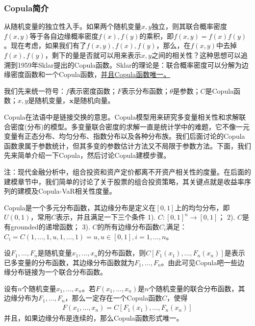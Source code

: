         \subsubsection{Copula简介}
            \par
            从随机变量的独立性入手。如果两个随机变量$x,y$独立，则其联合概率密度$f(x,y)$等于各自边缘概率密度$f(x),f(y)$的乘积，即$f(x,y) = f(x)f(y)$。现在考虑，如果我们有了$f(x,y),f(x),f(y)$，那么，在$f(x,y)$中去掉$f(x),f(y)$，剩下的量是否就可以用来表示$x,y$之间的相关性？这种思想可以追溯到1959年Sklar提出的Copula函数。Sklar的理论是：联合概率密度可以分解为边缘密度函数和一个Copula函数，\underline{并且Copula函数唯一。}
            \par
            我们先来统一符号：$f$表示密度函数；$F$表示分布函数；$\theta$是参数；$C$是Copula函数；$x,y$是随机变量，$\mathbf{x}$是随机向量。
            \par
            Copula在法语中是链接交换的意思。Copula模型用来研究多变量相关性和求解联合密度(分布)的模型。多变量联合密度的求解一直是统计学中的难题，它不像一元变量有正态分布、均匀分布、指数分布以及各种分布族。我们后面讨论的Copula函数隶属于参数统计，但其多变的参数估计方法又不局限于参数方法。下面，我们先来简单介绍一下Copula，然后讨论Copula建模步骤。
            \par
            注：现代金融分析中，组合投资和资产定价都离不开资产相关性的度量。在后面的建模章节中，我们简单的讨论了关于股票的组合投资策略，其关键点就是收益率序列的建模及Copula-VaR相关性度量。
            \begin{definition}[Copula函数的定义]
            Copula是一个多元分布函数，其边缘分布是定义在$[0,1]$上的均匀分布，即$U(0,1)$，常用$C$表示，并且满足一下三个条件
            1). $C:[0,1]^n\rightarrow [0,1]$；
            2). $C$是有grounded的递增函数；
            3). $C$的所有边缘分布函数$C_i$满足：$C_i = C(1,\dots,1,u,1,\dots,1) = u,u\in [0,1],i = 1,\dots,n$。
            \end{definition}
            \par
            设$F_1,\dots,F_n$是随机变量$x_1,\dots,x_n$的分布函数，则$C[F_1(x_1),\dots,F_n(x_n)]$是表示已多变量的分布函数，其边缘分布函数就为$F_1,\dots,F_n$。由此可见Copula吧一些边缘分布链接为一个联合分布函数。
            \begin{theorem}[Sklar定理]
            设有$n$个随机变量$x_1,\dots,x_n$。若$F(x_1,\dots,x_n)$是$n$个随机变量的联合分布函数，其边缘分布为$F_1,\dots,F_n$，那么一定存在一个Copula函数$C$，使得
            \begin{align*}
            F(x_1,\dots,x_n) = C[F_1(x_1),\dots,F_n(x_n)]
            \end{align*}
            并且，如果边缘分布是连续的，那么Copula函数形式唯一。
            \end{theorem}
